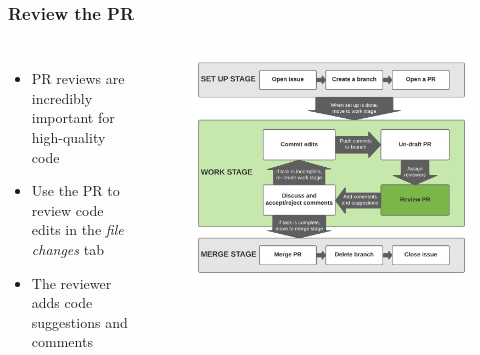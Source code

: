 \documentclass[aspectratio=169]{beamer} %
\begin{document}
\begin{frame}
	\frametitle{Review the PR}
	\begin{columns}[c]

		\begin{itemize}
			\setlength\itemsep{1em}
			\item PR reviews are incredibly important for high-quality code
			\item Use the PR to review code edits
			in the \textit{file changes} tab
			\item The reviewer adds code suggestions and comments
		\end{itemize}

		\vspace{-.75cm}
		\begin{figure}
			\centering
			\includegraphics[width=\textwidth]{./img/branch-pr-merge-cycle-S2-3.png}
		\end{figure}

	\end{columns}
\end{frame}
\end{document}

